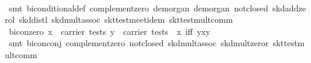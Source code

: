 \begin{isabellebody}
%
\isadelimproof
\ \ %
\endisadelimproof
%
\isatagproof
{}\isamarkupfalse%
\ {}smt\ biconditional{}def\ complement{}zero\ de{}morgan{}\ de{}morgan{}\ not{}closed\ skd{}add{}zerol\ skd{}distl\ skd{}mult{}assoc\ skt{}test{}meet{}idem\ skt{}test{}mult{}comm{}%
\endisatagproof
{\isafoldproof}%
%
\isadelimproof
\isanewline
%
\endisadelimproof
\isanewline
{}\isamarkupfalse%
\ bicon{}zero{}\ {}{}x\ {}\ carrier\ tests{}\ y\ {}\ carrier\ tests{}\ {}\ {}x\ iff\ y{}{}{}{}x{}y{}\ {}\ {}{}\isanewline
%
\isadelimproof
\ \ %
\endisadelimproof
%
\isatagproof
{}\isamarkupfalse%
\ {}smt\ bicon{}conj{}\ complement{}zero\ not{}closed\ skd{}mult{}assoc\ skd{}mult{}zeror\ skt{}test{}mult{}comm{}%
\endisatagproof
{\isafoldproof}%
%
\isadelimproof
\isanewline
%
\endisadelimproof
\isanewline
{}\isamarkupfalse%

\end{isabellebody}

